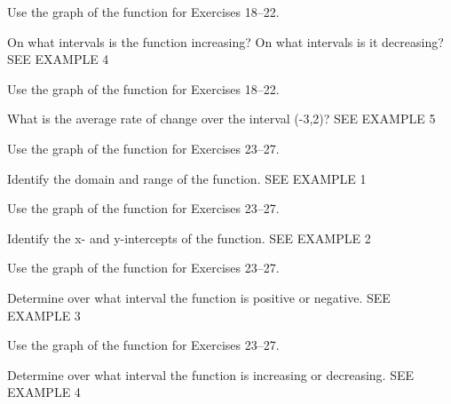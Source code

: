 \documentclass{article}
\newenvironment{practice}[2]{}{}        %
\newcommand{\answer}[1]{}               %
\newcommand{\placeholder}[2]{}          %
\begin{document}
\begin{practice}{21}{1}
Use the graph of the function for Exercises 18--22.

On what intervals is the function increasing? On what intervals is it decreasing? SEE EXAMPLE 4
\answer{decreasing: (-\infty,-1); increasing: (-1,\infty)}
\end{practice}

\begin{practice}{22}{1}
Use the graph of the function for Exercises 18--22.

What is the average rate of change over the interval (-3,2)? SEE EXAMPLE 5
\answer{1}
\end{practice}

\begin{practice}{23}{1}
Use the graph of the function for Exercises 23--27.

\placeholder{graph}{Shared graph for Exercises 23--27: blue connected line segments from solid (-5,0) to vertex (-1,2) to solid (5,-1). x-intercepts (-5,0) and (3,0); y-intercept (0,1.5). Square grid with horizontal (x) labels -4, -2, 0, 2, 4 and vertical (y) labels -4, -2, 2, 4; visible axes approximately -5 to 5 in both directions.}

Identify the domain and range of the function. SEE EXAMPLE 1
\answer{domain: [-5,5]; range: [-1,2]}
\end{practice}

\begin{practice}{24}{1}
Use the graph of the function for Exercises 23--27.

Identify the x- and y-intercepts of the function. SEE EXAMPLE 2
\answer{x-intercepts: -5, 3; y-intercept: 1.5}
\end{practice}

\begin{practice}{25}{1}
Use the graph of the function for Exercises 23--27.

Determine over what interval the function is positive or negative. SEE EXAMPLE 3
\answer{positive: (-5,3); negative: (3,5]}
\end{practice}

\begin{practice}{26}{1}
Use the graph of the function for Exercises 23--27.

Determine over what interval the function is increasing or decreasing. SEE EXAMPLE 4
\answer{increasing: [-5,-1); decreasing: (-1,5]}
\end{practice}
\end{document}
